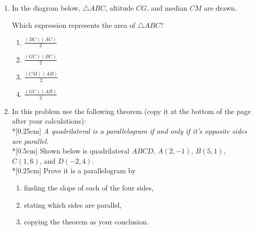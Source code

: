\documentclass[12pt, oneside]{article}
\begin{document}
\begin{enumerate}[itemsep=0cm]
\item In the diagram below, $\triangle ABC$, altitude $\overline{CG}$, and median $\overline{CM}$ are drawn.
\begin{center}
\end{center}
Which expression represents the area of $\triangle ABC$?
  \begin{multicols}{2}
  \begin{enumerate}
    \item $\displaystyle \frac{(BC)(AC)}{2}$
    \item $\displaystyle \frac{(GC)(BC)}{2}$
    \item $\displaystyle \frac{(CM)(AB)}{2}$
    \item $\displaystyle \frac{(GC)(AB)}{2}$
  \end{enumerate}
  \end{multicols}
  
\item In this problem use the following theorem (copy it at the bottom of the page after your calculations): \\*[0.25cm]
    \emph{A quadrilateral is a parallelogram if and only if it's opposite sides are parallel.}\\*[0.5cm]
    Shown below is quadrilateral $ABCD$, $A(2,-1)$, $B(5,1)$, $C(1,6)$, and $D(-2,4)$. \\*[0.25cm]
    Prove it is a parallelogram by
    \begin{enumerate}
      \item finding the slope of each of the four sides,
      \item stating which sides are parallel,
      \item copying the theorem as your conclusion.
    \end{enumerate}
    \begin{flushright} %
    \end{flushright}


\end{enumerate}
\end{document}
